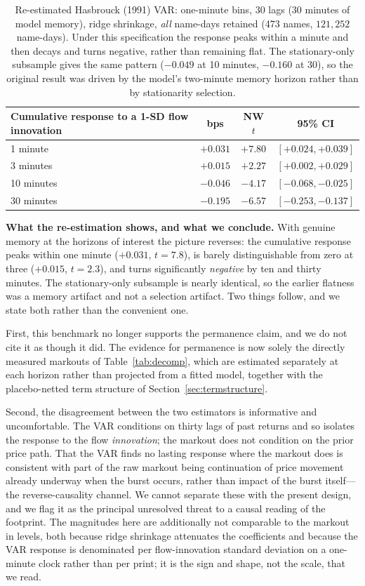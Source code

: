 \documentclass[11pt]{article}
\begin{document}
\begin{table}[htbp]
\centering
\begin{tabular}{lccc}
\toprule
\textbf{Cumulative response to a 1-SD flow innovation} & \textbf{bps} & \textbf{NW $t$} & \textbf{95\% CI} \\
\midrule
1 minute  & $+0.031$ & $+7.80$ & $[+0.024, +0.039]$ \\
3 minutes & $+0.015$ & $+2.27$ & $[+0.002, +0.029]$ \\
10 minutes & $-0.046$ & $-4.17$ & $[-0.068, -0.025]$ \\
30 minutes & $-0.195$ & $-6.57$ & $[-0.253, -0.137]$ \\
\bottomrule
\end{tabular}
\caption{Re-estimated Hasbrouck (1991) VAR: one-minute bins, 30 lags (30 minutes of model
memory), ridge shrinkage, \emph{all} name-days retained (473 names, $121{,}252$ name-days).
Under this specification the response peaks within a minute and then decays and turns
negative, rather than remaining flat. The stationary-only subsample gives the same pattern
($-0.049$ at 10 minutes, $-0.160$ at 30), so the original result was driven by the model's
two-minute memory horizon rather than by stationarity selection.}
\label{tab:hasbrouck}
\end{table}

\textbf{What the re-estimation shows, and what we conclude.} With genuine memory at the
horizons of interest the picture reverses: the cumulative response peaks within one minute
($+0.031$, $t=7.8$), is barely distinguishable from zero at three ($+0.015$, $t=2.3$), and
turns significantly \emph{negative} by ten and thirty minutes. The stationary-only
subsample is nearly identical, so the earlier flatness was a memory artifact and not a
selection artifact. Two things follow, and we state both rather than the convenient one.

First, this benchmark no longer supports the permanence claim, and we do not cite it as
though it did. The evidence for permanence is now solely the directly measured markouts of
Table~\ref{tab:decomp}, which are estimated separately at each horizon rather than
projected from a fitted model, together with the placebo-netted term structure of
Section~\ref{sec:termstructure}.

Second, the disagreement between the two estimators is informative and uncomfortable. The
VAR conditions on thirty lags of past returns and so isolates the response to the flow
\emph{innovation}; the markout does not condition on the prior price path. That the VAR
finds no lasting response where the markout does is consistent with part of the raw markout
being continuation of price movement already underway when the burst occurs, rather than
impact of the burst itself---the reverse-causality channel. We cannot separate these with
the present design, and we flag it as the principal unresolved threat to a causal reading of
the footprint. The magnitudes here are additionally not comparable to the markout in levels,
both because ridge shrinkage attenuates the coefficients and because the VAR response is
denominated per flow-innovation standard deviation on a one-minute clock rather than per
print; it is the sign and shape, not the scale, that we read.
\end{document}
